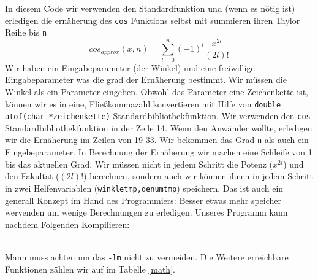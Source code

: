 In diesem Code wir verwenden den Standardfunktion und (wenn es nötig ist) erledigen
die ernäherung des \texttt{cos} Funktions selbst mit summieren ihren Taylor Reihe
bis \texttt{n}
\begin{equation}
cos_{approx}\left(x,n\right)=\sum_{l=0}^{n} \left(-1\right)^{l} \dfrac{x^{2l}}{\left(2l\right)!}
\end{equation}
Wir haben ein Eingabeparameter (der Winkel) und eine freiwillige Eingabeparameter
was die grad der Ernäherung bestimmt. Wir müssen die Winkel als ein Parameter eingeben.
Obwohl das Parameter eine Zeichenkette ist, können wir es in eine, Fließkommazahl konvertieren
mit Hilfe von \texttt{double atof(char *zeichenkette)} Standardbibliothekfunktion. 
Wir verwenden den \texttt{cos} Standardbibliothekfunktion in der Zeile 14. Wenn
den Anwänder wollte, erledigen wir die Ernäherung im Zeilen von 19-33. Wir bekommen 
das Grad \texttt{n} als auch ein Eingebeparameter. In Berechnung der Ernäherung wir machen 
eine Schleife von 1 bis das aktuellen Grad. Wir müssen nicht in jedem Schritt die 
Potenz ($x^{2i}$) und den Fakultät ($(2l)!$) berechnen, sondern auch wir können 
ihnen in jedem Schritt in zwei Helfenvariablen (\texttt{winkletmp,denumtmp}) speichern.
Das ist auch ein generall Konzept im Hand des Programmiers: Besser etwas mehr speicher
wervenden um wenige Berechnungen zu erledigen. 
Unseres Programm kann nachdem Folgenden Kompilieren:\\
\\
Mann muss achten um das \texttt{-lm} nicht zu vermeiden.
Die Weitere erreichbare  Funktionen zählen wir auf im Tabelle \ref{math}. 
